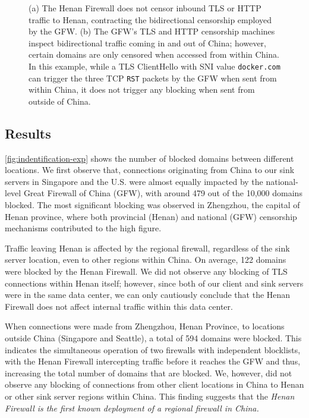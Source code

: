 \documentclass[conference,compsoc]{IEEEtran}
\begin{document}
\begin{figure}[t]
  \caption{
    (a) The Henan Firewall does not censor inbound TLS or HTTP traffic to Henan,
      contracting the bidirectional censorship employed by the GFW.
    (b) The GFW's TLS and HTTP censorship machines inspect bidirectional traffic
    coming in and out of China; however, certain domains are only censored when accessed from within China.
    In this example, while a TLS ClientHello with SNI value \texttt{docker.com}
    can trigger the three TCP \texttt{RST} packets by the GFW when sent from within China,
    it does not trigger any blocking when sent from outside of China.
  }

  \label{fig:inside-outside-comparison}
\end{figure}

\subsection{Results}


\autoref{fig:indentification-exp} shows the number of
blocked domains between different locations.
We first observe that,
connections originating from China to our sink servers in Singapore and the U.S. %
were almost equally impacted by the national-level Great Firewall of China (GFW),
with around 479 out of the 10,000 domains blocked.
The most significant blocking was observed in Zhengzhou,
the capital of Henan province, where both provincial (Henan) and national (GFW)
censorship mechanisms contributed to the high figure.

Traffic leaving Henan is affected by the regional firewall,
regardless of the sink server location, even to other regions within China.
On average, 122 domains were blocked by the Henan Firewall.
We did not observe any blocking of TLS connections within Henan itself;
however, since both of our client and sink servers were in the same data center,
we can only cautiously conclude that the Henan Firewall does not
affect internal traffic within this data center.

When connections were made from Zhengzhou, Henan Province,
to locations outside China (Singapore and Seattle),
a total of 594 domains were blocked.
This indicates the simultaneous operation of two
firewalls with independent blocklists, with the Henan Firewall
intercepting traffic before it reaches the GFW and thus,
increasing the total number of domains that are blocked.
We, however, did not observe any blocking of connections
from other client locations in China to Henan or other
sink server regions within China. This finding suggests
that the \emph{Henan Firewall is the first known
deployment of a regional firewall in China.}
\end{document}
